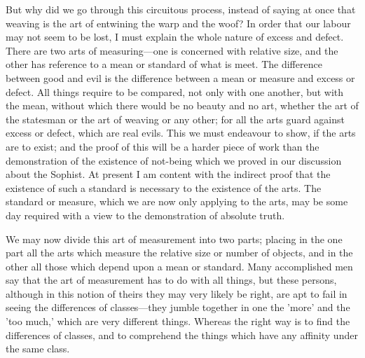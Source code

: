 \documentclass[11pt,letter]{article}
\begin{document}
\par  But why did we go through this circuitous process, instead of saying at once that weaving is the art of entwining the warp and the woof? In order that our labour may not seem to be lost, I must explain the whole nature of excess and defect. There are two arts of measuring—one is concerned with relative size, and the other has reference to a mean or standard of what is meet. The difference between good and evil is the difference between a mean or measure and excess or defect. All things require to be compared, not only with one another, but with the mean, without which there would be no beauty and no art, whether the art of the statesman or the art of weaving or any other; for all the arts guard against excess or defect, which are real evils. This we must endeavour to show, if the arts are to exist; and the proof of this will be a harder piece of work than the demonstration of the existence of not-being which we proved in our discussion about the Sophist. At present I am content with the indirect proof that the existence of such a standard is necessary to the existence of the arts. The standard or measure, which we are now only applying to the arts, may be some day required with a view to the demonstration of absolute truth.

\par  We may now divide this art of measurement into two parts; placing in the one part all the arts which measure the relative size or number of objects, and in the other all those which depend upon a mean or standard. Many accomplished men say that the art of measurement has to do with all things, but these persons, although in this notion of theirs they may very likely be right, are apt to fail in seeing the differences of classes—they jumble together in one the 'more' and the 'too much,' which are very different things. Whereas the right way is to find the differences of classes, and to comprehend the things which have any affinity under the same class.
\end{document}
